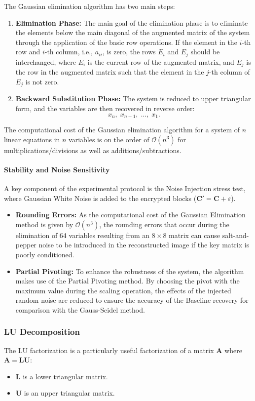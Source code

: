 \documentclass[11pt]{article}
\begin{document}
The Gaussian elimination algorithm has two main steps:
\begin{enumerate}
    \item \textbf{Elimination Phase:} The main goal of the elimination phase is to eliminate the elements below the main diagonal of the augmented matrix of the system through the application of the basic row operations. If the element in the $i$-th row and $i$-th column, i.e., $a_{ii}$, is zero, the rows $E_i$ and $E_j$ should be interchanged, where $E_i$ is the current row of the augmented matrix, and $E_j$ is the row in the augmented matrix such that the element in the $j$-th column of $E_j$ is not zero.
    \item \textbf{Backward Substitution Phase:} The system is reduced to upper triangular form, and the variables are then recovered in reverse order:
    \[
    x_n, \; x_{n-1}, \; \dots, \; x_1.
    \]
\end{enumerate}

The computational cost of the Gaussian elimination algorithm for a system of $n$ linear equations in $n$ variables is on the order of $\mathcal{O}(n^3)$ for multiplications/divisions as well as additions/subtractions.

\paragraph{Stability and Noise Sensitivity}
A key component of the experimental protocol is the Noise Injection stress test, where Gaussian White Noise is added to the encrypted blocks ($\mathbf{C}' = \mathbf{C} + \varepsilon$). 
\begin{itemize}
    \item \textbf{Rounding Errors:} As the computational cost of the Gaussian Elimination method is given by $\mathcal{O}(n^3)$, the rounding errors that occur during the elimination of 64 variables resulting from an $8 \times 8$ matrix can cause salt-and-pepper noise to be introduced in the reconstructed image if the key matrix is poorly conditioned.
    \item \textbf{Partial Pivoting:} To enhance the robustness of the system, the algorithm makes use of the Partial Pivoting method. By choosing the pivot with the maximum value during the scaling operation, the effects of the injected random noise are reduced to ensure the accuracy of the Baseline recovery for comparison with the Gauss-Seidel method.
\end{itemize}

\subsubsection{LU Decomposition}
The LU factorization is a particularly useful factorization of a matrix $\mathbf{A}$ where $\mathbf{A}=\mathbf{L}\mathbf{U}$:
\begin{itemize}
    \item $\mathbf{L}$ is a lower triangular matrix.
    \item $\mathbf{U}$ is an upper triangular matrix.
\end{itemize}
\end{document}
